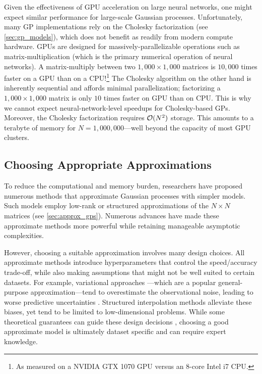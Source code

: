 Given the effectiveness of GPU acceleration on large neural networks, one might expect similar performance for large-scale Gaussian processes.
Unfortunately, many GP implementations rely on the Cholesky factorization (see \cref{sec:gp_models}), which does not benefit as readily from modern compute hardware.
GPUs are designed for massively-parallelizable operations such as matrix-multiplication (which is the primary numerical operation of neural networks).
A matrix-multiply between two $1,\!000 \times 1,\!000$ matrices is $10,\!000$ times faster on a GPU than on a CPU!\footnote{
	As measured on a NVIDIA GTX 1070 GPU versus an 8-core Intel i7 CPU.
}
The Cholesky algorithm on the other hand is inherently sequential and affords minimal parallelization;
factorizing a $1,\!000 \times 1,\!000$ matrix is only $10$ times faster on GPU than on CPU.
This is why we cannot expect neural-network-level speedups for Cholesky-based GPs.
Moreover, the Cholesky factorization requires $\bigo{N^2}$ storage.
This amounts to a terabyte of memory for $N=1,\!000,\!000$---well beyond the capacity of most GPU clusters.

\subsection{Choosing Appropriate Approximations}
To reduce the computational and memory burden, researchers have proposed numerous methods that approximate Gaussian processes with simpler models.
Such models employ low-rank or structured approximations of the $N \times N$ matrices (see \cref{sec:approx_gps}).
Numerous advances have made these approximate methods more powerful while retaining manageable asymptotic complexities.

However, choosing a suitable approximation involves many design choices.
All approximate methods introduce hyperparameters that control the speed/accuracy trade-off, while also making assumptions that might not be well suited to certain datasets.
For example, variational approaches \citep[e.g.][]{titsias2009variational,hensman2013gaussian}---which are a popular general-purpose approximation---tend to overestimate the observational noise, leading to worse predictive uncertainties \cite{turner2011two,bauer2016understanding}.
Structured interpolation methods \cite{wilson2015kernel} alleviate these biases, yet tend to be limited to low-dimensional problems.
While some theoretical guarantees can guide these design decisions \cite{burt2019rates}, choosing a good approximate model is ultimately dataset specific and can require expert knowledge.

